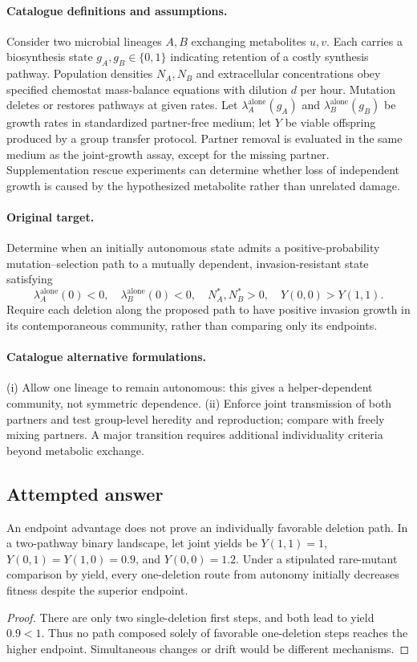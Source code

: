 \documentclass[11pt]{article}
\begin{document}
\paragraph{Catalogue definitions and assumptions.}
Consider two microbial lineages $A,B$ exchanging metabolites $u,v$. Each carries a biosynthesis state $g_A,g_B\in\{0,1\}$ indicating retention of a costly synthesis pathway. Population densities $N_A,N_B$ and extracellular concentrations obey specified chemostat mass-balance equations with dilution $d$ per hour. Mutation deletes or restores pathways at given rates. Let $\lambda_A^{\mathrm{alone}}(g_A)$ and $\lambda_B^{\mathrm{alone}}(g_B)$ be growth rates in standardized partner-free medium; let $Y$ be viable offspring produced by a group transfer protocol. Partner removal is evaluated in the same medium as the joint-growth assay, except for the missing partner. Supplementation rescue experiments can determine whether loss of independent growth is caused by the hypothesized metabolite rather than unrelated damage.
\paragraph{Original target.}
Determine when an initially autonomous state admits a positive-probability mutation--selection path to a mutually dependent, invasion-resistant state satisfying
\[
 \lambda_A^{\mathrm{alone}}(0)<0,\quad
 \lambda_B^{\mathrm{alone}}(0)<0,\quad
 N_A^*,N_B^*>0,\quad Y(0,0)>Y(1,1).
\]
Require each deletion along the proposed path to have positive invasion growth in its contemporaneous community, rather than comparing only its endpoints.
\paragraph{Catalogue alternative formulations.}
(i) Allow one lineage to remain autonomous: this gives a helper-dependent community, not symmetric dependence. (ii) Enforce joint transmission of both partners and test group-level heredity and reproduction; compare with freely mixing partners. A major transition requires additional individuality criteria beyond metabolic exchange.
\subsection{Attempted answer}
\begin{proposition}
An endpoint advantage does not prove an individually favorable deletion path. In a two-pathway binary landscape, let joint yields be $Y(1,1)=1$, $Y(0,1)=Y(1,0)=0.9$, and $Y(0,0)=1.2$. Under a stipulated rare-mutant comparison by yield, every one-deletion route from autonomy initially decreases fitness despite the superior endpoint.
\end{proposition}
\begin{proof}
There are only two single-deletion first steps, and both lead to yield $0.9<1$. Thus no path composed solely of favorable one-deletion steps reaches the higher endpoint. Simultaneous changes or drift would be different mechanisms.
\end{proof}
\end{document}
